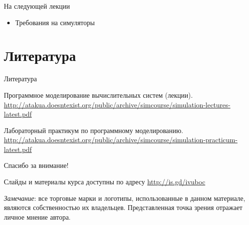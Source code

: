 \documentclass{beamer}
\begin{document}
\begin{frame}{На следующей лекции}
\begin{itemize}
\item Требования на симуляторы
\end{itemize}
\end{frame}


\section{Литература}

\begin{frame}[allowframebreaks]{Литература}
\begin{thebibliography}{99}
     Программное моделирование вычислительных систем (лекции). \url{http://atakua.doesntexist.org/public/archive/simcourse/simulation-lectures-latest.pdf}

     Лабораторный практикум по программному моделированию.  \url{http://atakua.doesntexist.org/public/archive/simcourse/simulation-practicum-latest.pdf}

\end{thebibliography}
\end{frame}


\begin{frame}

{\huge{Спасибо за внимание!}\par}

\vfill

Слайды и материалы курса доступны по адресу \url{http://is.gd/ivuboc} %

\vfill

\tiny{\textit{Замечание}: все торговые марки и логотипы, использованные в данном материале, являются собственностью их владельцев. Представленная точка зрения отражает личное мнение автора.
}

\end{frame}
\end{document}
